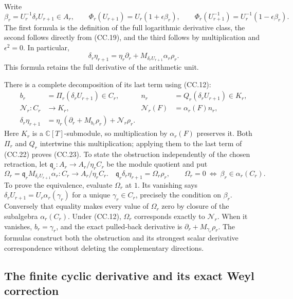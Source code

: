 Write
\[
 \beta_r=U_r^{-1}\delta_rU_{r+1}\in A_r,\qquad
 \Phi_r(U_{r+1})=U_r(1+\epsilon\beta_r),\qquad
 \Phi_r(U_{r+1}^{-1})=U_r^{-1}(1-\epsilon\beta_r).
 \tag{CC.21}
\]
The first formula is the definition of the full logarithmic derivative
class, the second follows directly from (CC.19), and the third follows
by multiplication and \(\epsilon^2=0\).
In particular,
\[
 \delta_r\eta_{r+1}
   =\eta_r\partial_r+
      M_{\delta_rU_{r+1}}\alpha_r\rho_r.
 \tag{CC.22}
\]
This formula retains the full derivative of the arithmetic unit.

There is a complete decomposition of its last term using (CC.12):
\[
\begin{aligned}
 b_r&=\Pi_r(\delta_rU_{r+1})\in C_r,&
 n_r&=Q_r(\delta_rU_{r+1})\in K_r,\\
 \mathcal N_r:C_r&\longrightarrow K_r,&
 \mathcal N_r(F)&=\alpha_r(F)n_r,\\
 \delta_r\eta_{r+1}
   &=\eta_r(\partial_r+M_{b_r}\rho_r)+\mathcal N_r\rho_r .
\end{aligned}
\tag{CC.23}
\]
Here \(K_r\) is a \(\mathbb C[T]\)-submodule, so multiplication
by \(\alpha_r(F)\) preserves it.  Both \(\Pi_r\) and \(Q_r\)
intertwine this multiplication; applying them to the last term
of (CC.22) proves (CC.23).
To state the obstruction independently of the chosen retraction, let
\(\mathfrak q_r:A_r\to A_r/\eta_rC_r\) be the module quotient and put
\[
 \Omega_r=\mathfrak q_r M_{\delta_rU_{r+1}}\alpha_r:
 C_r\longrightarrow A_r/\eta_rC_r.
 \quad
 \mathfrak q_r\delta_r\eta_{r+1}=\Omega_r\rho_r,
 \qquad
 \Omega_r=0\ \Longleftrightarrow\ \beta_r\in\alpha_r(C_r).
 \tag{CC.24}
\]
To prove the equivalence, evaluate \(\Omega_r\) at \(1\).
Its vanishing says \(\delta_rU_{r+1}=U_r\alpha_r(\gamma_r)\)
for a unique \(\gamma_r\in C_r\), precisely the condition on \(\beta_r\).
Conversely that equality makes every value of \(\Omega_r\) zero
by closure of the subalgebra \(\alpha_r(C_r)\).
Under (CC.12), \(\Omega_r\) corresponds exactly to \(\mathcal N_r\).
When it vanishes, \(b_r=\gamma_r\), and the exact pulled-back
derivative is \(\partial_r+M_{\gamma_r}\rho_r\).
The formulas construct both the obstruction and its strongest
scalar derivative correspondence without deleting the complementary
directions.

\subsection{The finite cyclic derivative and its exact Weyl correction}

